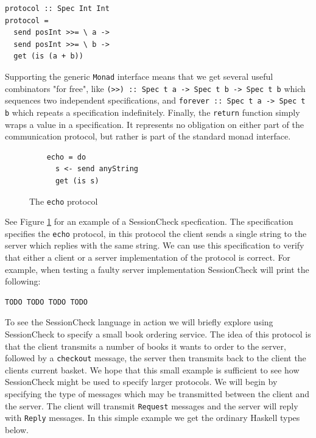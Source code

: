 \documentclass{article}
\begin{document}
\begin{verbatim}
protocol :: Spec Int Int
protocol =
  send posInt >>= \ a ->
  send posInt >>= \ b ->
  get (is (a + b))
\end{verbatim}


%
Supporting the generic \texttt{Monad} interface means that we get several useful combinators "for free", like
\texttt{(>>) :: Spec t a -> Spec t b -> Spec t b} which sequences two independent specifications, and
\texttt{forever :: Spec t a -> Spec t b} which repeats a specification indefinitely.
%
Finally, the \texttt{return} function simply wraps a value in a specification.
%
It represents no obligation on either part of the communication protocol, but rather is part of the standard
monad interface.
%

\begin{figure}
  \begin{verbatim}
    echo = do
      s <- send anyString
      get (is s)
  \end{verbatim}
  \caption{\label{fig:SessionCheck:echo} The \texttt{echo} protocol}
\end{figure}

See Figure \ref{fig:SessionCheck:echo} for an example of a SessionCheck specfication.
%
The specification specifies the \texttt{echo} protocol, in this protocol the client sends
a single string to the server which replies with the same string.
%
We can use this specification to verify that either a client or a server implementation of
the protocol is correct.
%
For example, when testing a faulty server implementation SessionCheck will print the following:
%
\begin{verbatim}
TODO TODO TODO TODO
\end{verbatim}

To see the SessionCheck language in action we will briefly explore using SessionCheck
to specify a small book ordering service.
%
The idea of this protocol is that the client transmits a number of books it wants to order to the
server, followed by a \texttt{checkout} message, the server then transmits back to the client
the clients current basket. 
%
We hope that this small example is sufficient to see how SessionCheck might be used to
specify larger protocols.
%
We will begin by specifying the type of messages which may be transmitted between the client and the
server.
%
The client will transmit \texttt{Request} messages and the server will reply with \texttt{Reply} messages.
%
In this simple example we get the ordinary Haskell types below.
\end{document}
